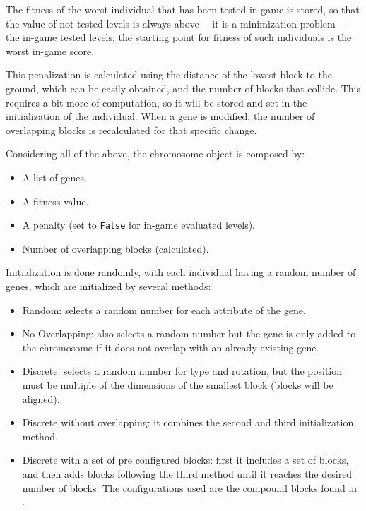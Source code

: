 \documentclass[sigconf]{acmart}
\begin{document}
The fitness of the worst individual that has been tested in game is
stored, so that the value of not tested levels is always above ---it is a 
minimization problem--- the in-game 
tested levels; the starting point for fitness of such individuals is the 
worst in-game score.

This penalization is calculated using the distance of the lowest block to the 
ground, which can be easily obtained, and the number of blocks that collide. 
This requires a bit more of computation, so it will be stored and set in the 
initialization of the individual. When a gene is modified, the number of 
overlapping blocks is recalculated for that specific change.

Considering all of the above, the chromosome object is composed by:
\begin{itemize}
	\item A list of genes.
	\item A fitness value.
	\item A penalty (set to {\tt False} for in-game evaluated levels).
	\item Number of overlapping blocks (calculated).
\end{itemize} %


Initialization is done randomly, with each individual having a random number of 
genes, which are initialized by several methods: 

\begin{itemize}
	\item Random: selects a random number for each attribute of the gene.
	\item No Overlapping: also selects a random number but the gene is only 
	added to the chromosome if it does not overlap with an already existing 
	gene.
	\item Discrete: selects a random number for type and rotation, but the 
	position must be multiple of the dimensions of the smallest block (blocks 
	will be aligned).
	\item Discrete without overlapping: it combines the second and third 
	initialization method.
	\item Discrete with a set of pre configured blocks: first it includes
	a set of blocks, and then adds blocks following the third method until
	it reaches the desired number of blocks. The configurations used are the
	compound blocks found in \cite{ferreira2014search}.
\end{itemize}
\end{document}
